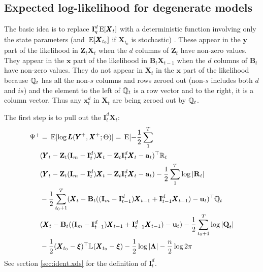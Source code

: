 \documentclass[]{article}
\def\xixi{\mbox{\boldmath $\xi$}}
\def\LAM{\mbox{\boldmath $\Lambda$}}
\def\LAMm{\mathbb{L}}
\def\ZZ{\mbox{$\mathbf Z$}}	\def\zz{\mbox{$\mathbf z$}}
\def\BB{\mbox{$\mathbf B$}}	\def\bb{\mbox{$\mathbf b$}}
\def\II{\mbox{$\mathbf I$}} \def\ii{\mbox{$\mathbf i$}}
\def\QQ{\mbox{$\mathbf Q$}}	 \def\qq{\mbox{$\mathbf q$}}
\def\RR{\mbox{$\mathbf R$}}	 \def\rr{\mbox{$\mathbf r$}}
\def\XX{\mbox{$\pmb{X}$}}	\def\xx{\mbox{$\pmb{x}$}}
\def\YY{\mbox{$\pmb{Y}$}}	\def\yy{\mbox{$\pmb{y}$}}
\def\LL{\mbox{$\pmb{L}$}}	\def\ll{\mbox{$\pmb{l}$}}
\def\E{\,\textup{\textrm{E}}}
\begin{document}
\subsection{Expected log-likelihood for degenerate models}

The basic idea is to replace $\II_q^d\E[\XX_t]$ with a deterministic function involving only  the state parameters (and $\E[\XX_{t_0}]$ if $\XX_{t_0}$ is stochastic) . These appear in the $\yy$ part of the likelihood in $\ZZ_t\XX_t$ when the $d$ columns of $\ZZ_t$ have non-zero values.  They appear in the $\xx$ part of the likelihood in $\BB_t\XX_{t-1}$ when the $d$ columns of $\BB_t$ have non-zero values.  They do not appear in $\XX_t$ in the $\xx$ part of the likelihood because $\mathbb{Q}_t$ has all the non-$s$ columns and rows zeroed out (non-$s$ includes both $d$ and $is$) and the element to the left of $\mathbb{Q}_t$ is a row vector and to the right, it is a column vector.  Thus any $\xx_t^d$ in $\XX_t$ are being zeroed out by $\mathbb{Q}_t$.

The first step is to pull out the $\II_t^{d}\XX_t$:
\begin{equation}
\begin{split}
\Psi^+ &= \E[\log\LL(\YY^+,\XX^+ ; \Theta)] = \E[-\frac{1}{2}\sum_1^T \\
& (\YY_t - \ZZ_t(\II_m-\II_t^d)\XX_t - \ZZ_t\II_t^d\XX_t - \aa_t)^\top \Rm_t\\ 
&(\YY_t - \ZZ_t(\II_m-\II_t^d)\XX_t - \ZZ_t\II_t^d\XX_t - \aa_t) -\frac{1}{2}\sum_1^T\log |\RR_t|\\
& -\frac{1}{2}\sum_{t_0+1}^T (\XX_t - \BB_t ((\II_m - \II_{t-1}^d)\XX_{t-1} + \II_{t-1}^d\XX_{t-1}) - \uu_t)^\top \Qm_t \\
&(\XX_t - \BB_t ((\II_m - \II_{t-1}^d)\XX_{t-1} + \II_{t-1}^d\XX_{t-1}) - \uu_t) - \frac{1}{2}\sum_{t_0+1}^T\log |\QQ_t| \\
&  - \frac{1}{2}(\XX_{t_0} - \xixi)^\top \LAMm(\XX_{t_0} - \xixi) - \frac{1}{2}\log |\LAM| -\frac{n}{2}\log 2\pi 
\end{split}
\end{equation}
See section \ref{sec:ident.xds} for the definition of  $\II_t^d$.
\end{document}
